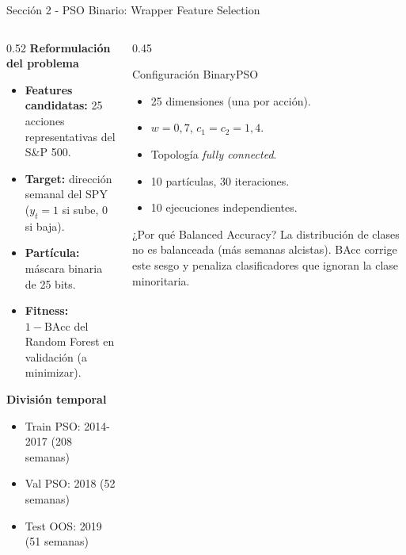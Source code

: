 \documentclass[aspectratio=169]{beamer}
\begin{document}
\begin{frame}{Sección 2 - PSO Binario: Wrapper Feature Selection}
  \begin{columns}[T]
    \begin{column}{0.52\textwidth}
      \textbf{Reformulación del problema}
      \begin{itemize}
        \item \textbf{Features candidatas:} 25 acciones
              representativas del S\&P 500.
        \item \textbf{Target:} dirección semanal del SPY
              ($y_t = 1$ si sube, $0$ si baja).
        \item \textbf{Partícula:} máscara binaria de 25 bits.
        \item \textbf{Fitness:} $1 - \text{BAcc}$ del Random Forest
              en validación (a minimizar).
      \end{itemize}

      \vspace{6pt}
      \textbf{División temporal}
      \begin{itemize}
        \item Train PSO: 2014-2017 (208 semanas)
        \item Val PSO: 2018 (52 semanas)
        \item Test OOS: 2019 (51 semanas)
      \end{itemize}
    \end{column}
    \begin{column}{0.45\textwidth}
      \begin{block}{Configuración BinaryPSO}
        \begin{itemize}
          \item 25 dimensiones (una por acción).
          \item $w=0{,}7$, $c_1=c_2=1{,}4$.
          \item Topología \emph{fully connected}.
          \item 10 partículas, 30 iteraciones.
          \item 10 ejecuciones independientes.
        \end{itemize}
      \end{block}

      \vspace{6pt}
      \begin{block}{¿Por qué Balanced Accuracy?}
        La distribución de clases no es balanceada
        (más semanas alcistas).
        BAcc corrige este sesgo y penaliza clasificadores
        que ignoran la clase minoritaria.
      \end{block}
    \end{column}
  \end{columns}
\end{frame}
\end{document}
